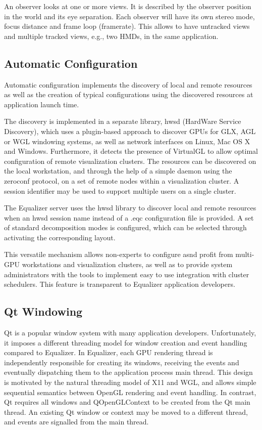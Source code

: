\documentclass[10pt,journal,compsoc]{IEEEtran}
\begin{document}
\label{SEC_observer}
An observer looks at one or more views. It is described by the observer position
in the world and its eye separation. Each observer will have its own stereo
mode, focus distance and frame loop (framerate). This allows to have untracked
views and multiple tracked views, e.g., two HMDs, in the same application.

\subsection{Automatic Configuration}

Automatic configuration implements the discovery of local and remote resources
as well as the creation of typical configurations using the discovered resources
at application launch time.

The discovery is implemented in a separate library, hwsd (HardWare Service
Discovery), which uses a plugin-based approach to discover GPUs for GLX, AGL or
WGL windowing systems, as well as network interfaces on Linux, Mac OS X and
Windows. Furthermore, it detects the presence of VirtualGL to allow optimal
configuration of remote visualization clusters. The resources can be discovered
on the local workstation, and through the help of a simple daemon using the
zeroconf protocol, on a set of remote nodes within a visualization cluster. A
session identifier may be used to support multiple users on a single cluster.

The Equalizer server uses the hwsd library to discover local and remote
resources when an hwsd session name instead of a \textsf{.eqc} configuration
file is provided. A set of standard decomposition modes is configured, which can
be selected through activating the corresponding layout.

This versatile mechanism allows non-experts to configure asnd profit from
multi-GPU workstations and visualization clusters, as well as to provide system
administrators with the tools to implement easy to use integration with cluster
schedulers. This feature is transparent to Equalizer application developers.

\subsection{Qt Windowing}

Qt is a popular window system with many application developers. Unfortunately,
it imposes a different threading model for window creation and event handling
compared to Equalizer. In Equalizer, each GPU rendering thread is independently
responsible for creating its windows, receiving the events and eventually
dispatching them to the application process main thread. This design is
motivated by the natural threading model of X11 and WGL, and allows simple
sequential semantics between OpenGL rendering and event handling. In contrast,
Qt requires all windows and QOpenGLContext to be created from the Qt main
thread. An existing Qt window or context may be moved to a different thread, and
events are signalled from the main thread.
\end{document}
